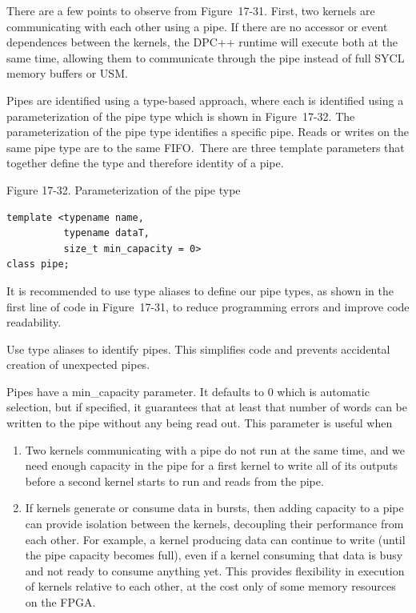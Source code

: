 There are a few points to observe from Figure 17-31. First, two kernels are communicating with each other using a pipe. If there are no accessor or event dependences between the kernels, the DPC++ runtime will execute both at the same time, allowing them to communicate through the pipe instead of full SYCL memory buffers or USM.\par

Pipes are identified using a type-based approach, where each is identified using a parameterization of the pipe type which is shown in Figure 17-32. The parameterization of the pipe type identifies a specific pipe. Reads or writes on the same pipe type are to the same FIFO. There are three template parameters that together define the type and therefore identity of a pipe.\par

\hspace*{\fill} \par %
Figure 17-32. Parameterization of the pipe type
\begin{lstlisting}[caption={}]
template <typename name,
		  typename dataT,
		  size_t min_capacity = 0>
class pipe;
\end{lstlisting}

It is recommended to use type aliases to define our pipe types, as shown in the first line of code in Figure 17-31, to reduce programming errors and improve code readability.\par

\begin{tcolorbox}[colback=red!5!white,colframe=red!75!black]
Use type aliases to identify pipes. This simplifies code and prevents accidental creation of unexpected pipes.
\end{tcolorbox}

Pipes have a min\_capacity parameter. It defaults to 0 which is automatic selection, but if specified, it guarantees that at least that number of words can be written to the pipe without any being read out. This parameter is useful when\par

\begin{enumerate}
	\item Two kernels communicating with a pipe do not run at the same time, and we need enough capacity in the pipe for a first kernel to write all of its outputs before a second kernel starts to run and reads from the pipe.
	\item If kernels generate or consume data in bursts, then adding capacity to a pipe can provide isolation between the kernels, decoupling their performance from each other. For example, a kernel producing data can continue to write (until the pipe capacity becomes full), even if a kernel consuming that data is busy and not ready to consume anything yet. This provides flexibility in execution of kernels relative to each other, at the cost only of some memory resources on the FPGA.
\end{enumerate}

